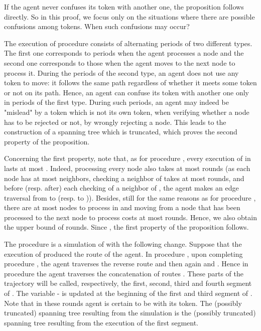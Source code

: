 \documentclass[11pt]{article}
\newcommand{\qed}{\hfill  \bigbreak}
\newenvironment{proof}{\noindent {\bf Proof.}}{\qed}
\begin{document}
\begin{proof}
{If the agent never confuses its token with another one, the proposition follows directly. So in this proof, we focus only on the situations where there are possible confusions among tokens. When such confusions may occur? }

{The execution of procedure  consists of alternating periods of two different types. The first one corresponds to periods when the agent processes a node and the second one corresponds to those when the agent moves to the next node to process it. During the periods of the second type, an agent does not use any token to move: it follows the same path regardless of whether it meets some token or not on its path. Hence, an agent can confuse its token with another one only in periods of the first type. During such periods, an agent may indeed be "mislead" by a token which is not its own token, when verifying whether a node has to be rejected or not, by wrongly rejecting a node. This leads to the construction of a spanning tree which is truncated, which proves the second property of the proposition.}

{Concerning the first property, note that, as for procedure , every execution of  in  lasts at most . Indeed,  processing every node  also takes at most  rounds (as each node  has at most  neighbors, checking a neighbor of  takes at most  rounds, and before (resp. after) each checking of a neighbor  of , the agent makes an edge traversal from  to  (resp.  to )). Besides, still for the same reasons as for procedure , there are at most  nodes to process in  and moving from a node that has been processed to the next node to process costs at most  rounds. Hence, we also obtain the upper bound of  rounds. Since , the first property of the proposition follows.}
\end{proof}
 
{The procedure  is a simulation of  with the following change.}
 Suppose that the execution of {} produced the route  of the agent. In procedure , upon completing
 procedure , the agent traverses the reverse route  and then again  and . Hence in procedure 
 the agent traverses the concatenation of routes . These parts of the trajectory will be called, respectively, the
 first, second, third and fourth segment of .
 The variable - is updated at the beginning of the first and third segment of . Note that in these rounds agent  is certain to be with its token. {The (possibly truncated) spanning tree resulting from the simulation  is the (possibly truncated) spanning tree resulting from the execution of the first segment.}
\end{document}
